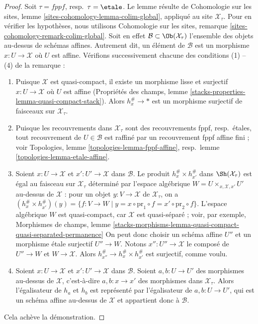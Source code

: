 \begin{proof}
Soit $\tau = fppf$, resp.\ $\tau = \etale$. Le lemme résulte de
Cohomologie sur les sites, lemme \ref{sites-cohomology-lemma-colim-global},
appliqué au site $\mathcal{X}_\tau$. Pour en vérifier les hypothèses, nous
utilisons Cohomologie sur les sites, remarque \ref{sites-cohomology-remark-colim-global}.
Soit en effet $\mathcal{B} \subset \Ob(\mathcal{X}_\tau)$ l'ensemble
des objets au-dessus de schémas affines. Autrement dit, un élément
de $\mathcal{B}$ est un morphisme $x : U \to \mathcal{X}$ où $U$ est affine.
Vérifions successivement chacune des conditions (1) -- (4) de la remarque :
\begin{enumerate}
\item Puisque $\mathcal{X}$ est quasi-compact, il existe un morphisme
lisse et surjectif $x : U \to \mathcal{X}$ où $U$ est affine
(Propriétés des champs, lemme
\ref{stacks-properties-lemma-quasi-compact-stack}).
Alors $h_x^\# \to *$ est un morphisme surjectif de faisceaux sur $\mathcal{X}_\tau$.
\item Puisque les recouvrements dans $\mathcal{X}_\tau$ sont des recouvrements
fppf, resp.\ étales, tout recouvrement de $U \in \mathcal{B}$ est raffiné
par un recouvrement fppf affine fini ; voir
Topologies, lemme \ref{topologies-lemma-fppf-affine},
resp.\ lemme \ref{topologies-lemma-etale-affine}.
\item Soient $x : U \to \mathcal{X}$ et $x' : U' \to \mathcal{X}$ dans
$\mathcal{B}$. Le produit $h_x^\# \times h_{x'}^\#$ dans
$\Sh(\mathcal{X}_\tau)$ est égal au faisceau sur $\mathcal{X}_\tau$
déterminé par l'espace algébrique $W = U \times_{x, \mathcal{X}, x'} U'$ au-dessus de
$\mathcal{X}$ : pour un objet $y : V \to \mathcal{X}$ de
$\mathcal{X}_\tau$, on a
$(h_x^\# \times h_{x'}^\#)(y) = \{f : V \to W \mid y =
x \circ \text{pr}_1 \circ f = x' \circ \text{pr}_2 \circ f\}$.
L'espace algébrique $W$ est quasi-compact, car $\mathcal{X}$
est quasi-séparé ; voir, par exemple, Morphismes de champs, lemme
\ref{stacks-morphisms-lemma-quasi-compact-quasi-separated-permanence}
On peut donc choisir un schéma affine $U''$ et
un morphisme étale surjectif $U'' \to W$. Notons $x'' : U'' \to \mathcal{X}$
le composé de $U'' \to W$ et $W \to \mathcal{X}$. Alors
$h_{x''}^\# \to h_x^\# \times h_{x'}^\#$ est surjectif, comme voulu.
\item Soient $x : U \to \mathcal{X}$ et $x' : U' \to \mathcal{X}$ dans
$\mathcal{B}$. Soient $a, b : U \to U'$ des morphismes au-dessus de $\mathcal{X}$,
c'est-à-dire $a, b  : x \to x'$ des morphismes dans $\mathcal{X}_\tau$.
Alors l'égalisateur de $h_a$ et $h_b$ est représenté par
l'égalisateur de $a, b : U \to U'$, qui est un
schéma affine au-dessus de $\mathcal{X}$ et appartient donc à $\mathcal{B}$.
\end{enumerate}
Cela achève la démonstration.
\end{proof}

